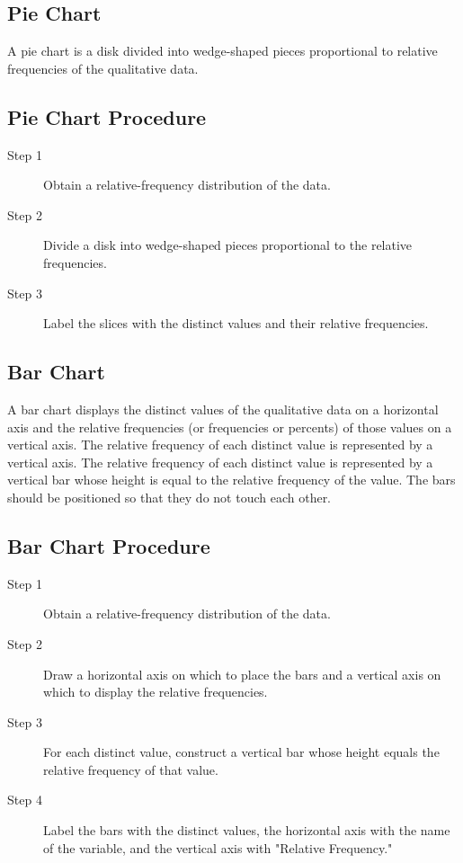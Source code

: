 \documentclass[12pt]{article}
\begin{document}
        \subsection*{Pie Chart}
            A pie chart is a disk divided into wedge-shaped pieces proportional to relative
            frequencies of the qualitative data.
        \subsection*{Pie Chart Procedure}
            \begin{description}
                \item[Step 1] Obtain a relative-frequency distribution of the data.
                \item[Step 2] Divide a disk into wedge-shaped pieces proportional to the
                relative frequencies.
                \item[Step 3] Label the slices with the distinct values and their relative
                frequencies.   
            \end{description}
        \subsection*{Bar Chart}
            A bar chart displays the distinct values of the qualitative data on a horizontal
            axis and the relative frequencies (or frequencies or percents) of those values
            on a vertical axis. The relative frequency of each distinct value is represented
            by a vertical axis. The relative frequency of each distinct value is represented
            by a vertical bar whose height is equal to the relative frequency of the value.
            The bars should be positioned so that they do not touch each other.
        \subsection*{Bar Chart Procedure}
            \begin{description}
                \item[Step 1] Obtain a relative-frequency distribution of the data.
                \item[Step 2] Draw a horizontal axis on which to place the bars and a
                vertical axis on which to display the relative frequencies.
                \item[Step 3] For each distinct value, construct a vertical bar whose height
                equals the relative frequency of that value.
                \item[Step 4] Label the bars with the distinct values, the horizontal axis
                with the name of the variable, and the vertical axis with "Relative 
                Frequency."  
            \end{description}
\end{document}
